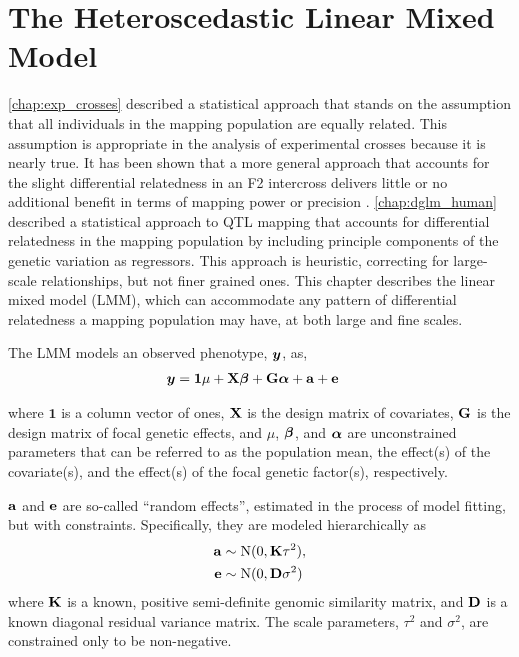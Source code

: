 \chapter{The Heteroscedastic Linear Mixed Model}
\label{chap:het_LMM}

\cref{chap:exp_crosses} described a statistical approach that stands on the assumption that all individuals in the mapping population are equally related.
This assumption is appropriate in the analysis of experimental crosses because it is nearly true.
It has been shown that a more general approach that accounts for the slight differential relatedness in an F2 intercross delivers little or no additional benefit in terms of mapping power or precision \citep{Parker2014b}.
\cref{chap:dglm_human} described a statistical approach to QTL mapping that accounts for differential relatedness in the mapping population by including principle components of the genetic variation as regressors.
This approach is heuristic, correcting for large-scale relationships, but not finer grained ones.
This chapter describes the linear mixed model (LMM), which can accommodate any pattern of differential relatedness a mapping population may have, at both large and fine scales.

The LMM models an observed phenotype, $\bm{y}$, as,
\begin{align}
	\bm{y}	&= \mathbf{1}\mu + \mathbf{X}\boldsymbol{\beta} + \mathbf{G}\boldsymbol{\alpha} + \mathbf{a} + \mathbf{e}  \label{eq:lmm}
\end{align}

where $\mathbf{1}$ is a column vector of ones, $\mathbf{X}$ is the design matrix of covariates, $\mathbf{G}$ is the design matrix of focal genetic effects, and $\mu$, $\boldsymbol{\beta}$, and $\boldsymbol{\alpha}$ are unconstrained parameters that can be referred to as the population mean, the effect(s) of the covariate(s), and the effect(s) of the focal genetic factor(s), respectively.

$\mathbf{a}$ and $\mathbf{e}$ are so-called ``random effects'', estimated in the process of model fitting, but with constraints.
Specifically, they are modeled hierarchically as
\begin{align}
    \mathbf{a} &\sim \mathrm{N}(0, \mathbf{K} \tau^2) ,   \label{eq:a}\\
    \mathbf{e} &\sim \mathrm{N}(0, \mathbf{D} \sigma^2)   \label{eq:e}
\end{align}
where $\mathbf{K}$ is a known, positive semi-definite genomic similarity matrix, and $\mathbf{D}$ is a known diagonal residual variance matrix.
The scale parameters, $\tau^2$ and $\sigma^2$, are constrained only to be non-negative.

